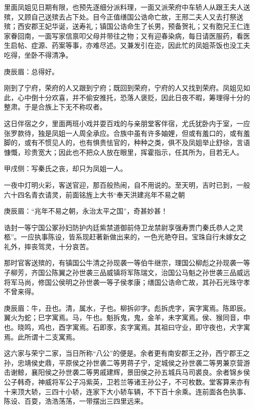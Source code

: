 \begin{parag}
    里面凤姐见日期有限，也预先逐细分派料理，一面又派荣府中车轿人从跟王夫人送殡，又顾自己送殡去占下处。目今正值缮国公诰命亡故，王邢二夫人又去打祭送殡；西安郡王妃华诞，送寿礼；镇国公诰命生了长男，预备贺礼；又有胞兄王仁连家眷回南，一面写家信禀叩父母并带往之物；又有迎春染病，每日请医服药，看医生启帖、症源、药案等事，亦难尽述。又兼发引在迩，因此忙的凤姐茶饭也没工夫吃得，坐卧不得清净。\begin{note}庚辰眉：总得好。\end{note}刚到了宁府，荣府的人又跟到宁府；既回到荣府，宁府的人又找到荣府。凤姐见如此，心中倒十分欢喜，并不偷安推托，恐落人褒贬，因此日夜不暇，筹理得十分的整肃。于是合族上下无不称叹者。
\end{parag}


\begin{parag}
    这日伴宿之夕，里面两班小戏并耍百戏的与亲朋堂客伴宿，尤氏犹卧内于室，一应张罗款待，独是凤姐一人周全承应。合族中虽有许多妯娌，但或有羞口的，或有羞脚的，或有不惯见人的，也有惧贵怯官的，种种之类，俱不及凤姐举止舒徐，言语慷慨，珍贵宽大；因此也不把众人放在眼里，挥霍指示，任其所为，目若无人。\begin{note}甲戌侧：写秦氏之丧，却只为凤姐一人。\end{note}一夜中灯明火彩，客送官迎，那百般热闹，自不用说的。至天明，吉时已到，一般六十四名青衣请灵，前面铭旌上大书“奉天洪建兆年不易之朝\begin{note}庚辰眉：“兆年不易之朝，永治太平之国”，奇甚妙甚！\end{note}诰封一等宁国公冢孙妇防护内廷紫禁道御前侍卫龙禁尉享强寿贾门秦氏恭人之灵柩”。一应执事陈设，皆系现赶著新做出来的，一色光艳夺目。宝珠自行未嫁女之礼外，摔丧驾灵，十分哀苦。
\end{parag}


\begin{parag}
    那时官客送殡的，有镇国公牛清之孙现袭一等伯牛继宗，理国公柳彪之孙现袭一等子柳芳，齐国公陈翼之孙世袭三品威镇将军陈瑞文，治国公马魁之孙世袭三品威远将军马尚，修国公侯明之孙世袭一等子侯孝康；缮国公诰命亡故，其孙石光珠守孝不曾来得。\begin{note}庚辰眉：牛，丑也。清，属水，子也。柳拆卯字。彪拆虎字，寅字寓焉。陈即辰。翼火为蛇；巳字寓焉。马，午也。魁拆鬼，鬼，金羊，未字寓焉。侯、猴同音，申也。晓鸣，鸡也，酉字寓焉。石即豕，亥字寓焉。其祖曰守业，即守夜也，犬字寓焉。此所谓十二支寓焉。\end{note}这六家与荣宁二家，当日所称“八公”的便是。余者更有南安郡王之孙，西宁郡王之孙，忠靖侯史鼎，平原侯之孙世袭二等男蒋子宁，定城侯之孙世袭二等男兼京营游击谢鲸，襄阳侯之孙世袭二等男戚建辉，景田侯之孙五城兵马司裘良。余者锦乡侯公子韩奇，神威将军公子冯紫英，卫若兰等诸王孙公子，不可枚数。堂客算来亦有十来顶大轿，三四十小轿，连家下大小轿车辆，不下百十余乘。连前面各色执事、陈设、百耍，浩浩荡荡，一带摆出三四里远来。
\end{parag}


